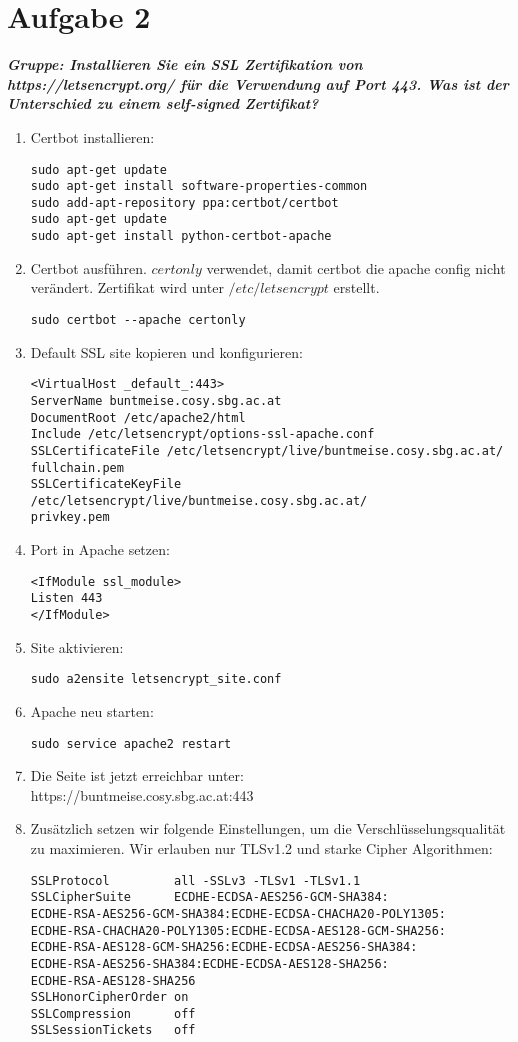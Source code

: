 \documentclass[12pt, a4paper]{report}
\begin{document}
\section*{Aufgabe 2}
\textbf{\textit{Gruppe: Installieren Sie ein SSL Zertifikation von https://letsencrypt.org/ für die
Verwendung auf Port 443. Was ist der Unterschied zu einem self-signed Zertifikat?}}\\
\begin{enumerate}
	\item Certbot installieren:
	\begin{verbatim}
sudo apt-get update
sudo apt-get install software-properties-common
sudo add-apt-repository ppa:certbot/certbot
sudo apt-get update
sudo apt-get install python-certbot-apache 
	\end{verbatim}
	\item Certbot ausführen. $certonly$ verwendet, damit certbot die apache config nicht verändert. Zertifikat wird unter $/etc/letsencrypt$ erstellt.
	\begin{verbatim}
sudo certbot --apache certonly
	\end{verbatim}
	\item Default SSL site kopieren und konfigurieren:
	\begin{verbatim}
<VirtualHost _default_:443>	
ServerName buntmeise.cosy.sbg.ac.at
DocumentRoot /etc/apache2/html
Include /etc/letsencrypt/options-ssl-apache.conf
SSLCertificateFile /etc/letsencrypt/live/buntmeise.cosy.sbg.ac.at/
fullchain.pem
SSLCertificateKeyFile /etc/letsencrypt/live/buntmeise.cosy.sbg.ac.at/
privkey.pem
	\end{verbatim}
	\item Port in Apache setzen:
	\begin{verbatim}
<IfModule ssl_module>
Listen 443
</IfModule>
	\end{verbatim}
	\item Site aktivieren:
	\begin{verbatim}
sudo a2ensite letsencrypt_site.conf
	\end{verbatim}	
	\item Apache neu starten:
	\begin{verbatim}
sudo service apache2 restart
	\end{verbatim}
	\item Die Seite ist jetzt erreichbar unter:\\
	https://buntmeise.cosy.sbg.ac.at:443
	\item Zusätzlich setzen wir folgende Einstellungen, um die Verschlüsselungsqualität zu maximieren. Wir erlauben nur TLSv1.2 und starke Cipher Algorithmen:
	\begin{verbatim}
SSLProtocol         all -SSLv3 -TLSv1 -TLSv1.1
SSLCipherSuite      ECDHE-ECDSA-AES256-GCM-SHA384:
ECDHE-RSA-AES256-GCM-SHA384:ECDHE-ECDSA-CHACHA20-POLY1305:
ECDHE-RSA-CHACHA20-POLY1305:ECDHE-ECDSA-AES128-GCM-SHA256:
ECDHE-RSA-AES128-GCM-SHA256:ECDHE-ECDSA-AES256-SHA384:
ECDHE-RSA-AES256-SHA384:ECDHE-ECDSA-AES128-SHA256:
ECDHE-RSA-AES128-SHA256
SSLHonorCipherOrder on
SSLCompression      off
SSLSessionTickets   off
	\end{verbatim}
\end{enumerate}
\end{document}
